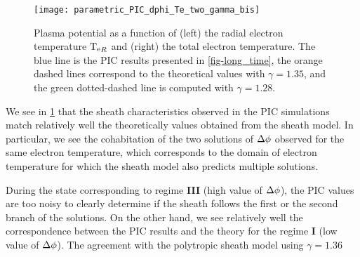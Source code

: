     \begin{figure}[hbt]
      \centering
      \texttt{[image: parametric\_PIC\_dphi\_Te\_two\_gamma\_bis]}
      \caption{Plasma potential as a function of (left) the radial electron temperature $\mathrm{T_e}_R$ and (right) the total electron temperature. The blue line is the \acs{PIC} results presented in \cref{fig-long_time}, the orange dashed lines correspond to the theoretical values with $\gamma=1.35$, and the green dotted-dashed line is computed with $\gamma=1.28$.}
      \label{fig-dphi_te_PIc2}
    \end{figure}
    
    We see in \cref{fig-dphi_te_PIc2} that the sheath characteristics observed in the \ac{PIC}  simulations match relatively well the theoretically values obtained from the sheath model.
    In particular, we see the cohabitation of the two solutions of $\Delta \phi$ observed for the same electron temperature, which corresponds to the domain of electron temperature for which the sheath model also predicts multiple solutions.
    
    During the state corresponding to regime {\bf III} (high value of  $\Delta \phi$), the \ac{PIC} values are too noisy to clearly determine if the sheath follows the first or the second branch of the solutions.
    On the other hand, we see relatively well the correspondence between the \ac{PIC} results and the theory for the regime {\bf I} (low value of $\Delta \phi$).
    The agreement with the polytropic sheath model using $\gamma = 1.36$ 
    
    
